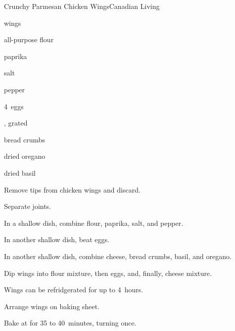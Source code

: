 \begin{recipe}{Crunchy Parmesan Chicken Wings}{Canadian Living}{}

\begin{ingredients}
\item {}  wings
\item \C{\half} all-purpose flour
\item \tp{\half} paprika
\item \tp{\quarter} salt
\item \tp{\quarter} pepper
\item 4~eggs
\item {} , grated
\item \C{\half} bread crumbs
\item {} dried oregano
\item {} dried basil
\end{ingredients}

\begin{directions}
\item Remove tips from chicken wings and discard.
\item Separate joints.
\item In a shallow dish, combine flour, paprika, salt, and pepper.
\item In another shallow dish, beat eggs.
\item In another shallow dish, combine cheese, bread crumbs, basil, and oregano.
\item Dip wings into flour mixture, then eggs, and, finally, cheese mixture.
\item Wings can be refridgerated for up to 4~hours.
\item Arrange wings on baking sheet.
\item Bake at  for 35 to 40~minutes, turning once.
\end{directions}

\end{recipe}
